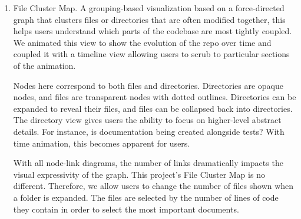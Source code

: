 \documentclass[12 pt]{article}
\begin{document}
\begin{enumerate}
        We augment the Word Cloud through simple tf-idf weighting of terms.
        Rather than having users sift through all terms manually, we attempt to
        provide important, unique terms to sift through. At times, authors and
        referenced libraries are identified, providing a higher level of understanding
        than the most frequently used terms alone would provide.
    \item File Cluster Map. A grouping-based visualization based on a force-directed
        graph that clusters files or directories that
        are often modified together, this helps users understand which parts
        of the codebase are most tightly coupled. We animated this view to show
        the evolution of the repo over time and coupled it with a timeline view
        allowing users to scrub to particular sections of the animation. 

        Nodes here correspond to both files and directories. Directories are opaque nodes,
        and files are transparent nodes with dotted outlines. Directories can be expanded 
        to reveal their files, and files can be collapsed back into directories. The directory view gives users
        the ability to focus on higher-level abstract details. For instance, is documentation
        being created alongside tests? With time animation, this becomes apparent for users.

        With all node-link diagrams, the number of links dramatically impacts the visual
        expressivity of the graph. This project's File Cluster Map is no different. Therefore,
        we allow users to change the number of files shown when a folder is expanded. The
        files are selected by the number of lines of code they contain in order to select
        the most important documents.
\end{enumerate}
\end{document}
